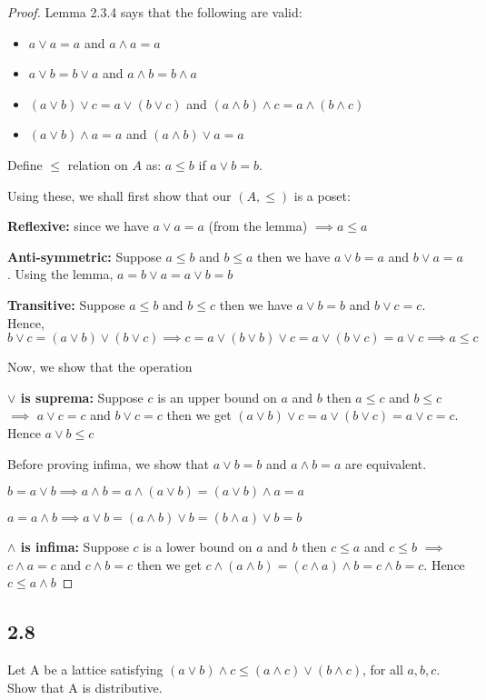 \documentclass[12pt]{article}
\begin{document}
\begin{proof}
Lemma 2.3.4 says that the following are valid:
\begin{itemize}
    \item $a \vee a = a$ and $a \wedge a = a$
    \item $a \vee b = b \vee a$ and $a \wedge b = b \wedge a$
    \item $(a \vee b) \vee c = a \vee (b \vee c)$ and $(a \wedge b) \wedge c = a \wedge (b \wedge c)$
    \item $(a \vee b) \wedge a = a$ and $(a \wedge b) \vee a = a$
\end{itemize}

Define $\leq$ relation on $A$ as: $a \leq b$ if $a \vee b = b$.

Using these, we shall first show that our $(A, \leq)$ is a poset:

\textbf{Reflexive:} since we have $a \vee a = a$ (from the lemma) $\implies a \leq a$

\textbf{Anti-symmetric:} Suppose $a \leq b$ and $b \leq a$ then we have $a \vee b = a$ and $b \vee a = a$. Using the lemma, $a = b \vee a = a \vee b = b$

\textbf{Transitive:} Suppose $a \leq b$ and $b \leq c$ then we have $a \vee b = b$ and $b \vee c = c$. Hence, $b \vee c = (a \vee b) \vee (b \vee c) \implies c = a \vee (b \vee b) \vee c = a \vee (b \vee c) = a \vee c \implies a \leq c$

Now, we show that the operation 

\textbf{$\vee$ is suprema:} Suppose $c$ is an upper bound on $a$ and $b$ then $a \leq c$ and $b \leq c$ $\implies$ $a \vee c = c$ and $b \vee c = c$ then we get $(a \vee b) \vee c = a \vee (b \vee c) = a \vee c = c$. Hence $a \vee b \leq c$

Before proving infima, we show that $a \vee b = b$ and $a \wedge b = a$ are equivalent.

$b = a \vee b \implies a \wedge b = a \wedge (a \vee b) = (a \vee b) \wedge a = a$

$a = a \wedge b \implies a \vee b = (a \wedge b) \vee b = (b \wedge a) \vee b = b$

\textbf{$\wedge$ is infima:} Suppose $c$ is a lower bound on $a$ and $b$ then $c \leq a$ and $c \leq b$ $\implies$ $c \wedge a = c$ and $c \wedge b = c$ then we get $c \wedge (a \wedge b) = (c \wedge a) \wedge b = c \wedge b = c$. Hence $c \leq a \wedge b$
\end{proof}

\subsection*{2.8}
Let A be a lattice satisfying $(a \vee b) \wedge c \leq (a \wedge c) \vee (b \wedge c)$, for all $a, b, c$. Show that A is distributive. \\
\end{document}
